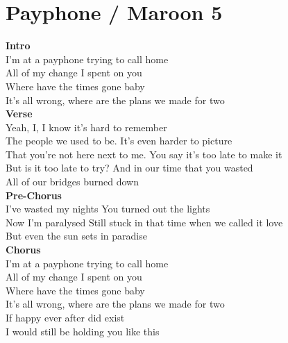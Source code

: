 \section{Payphone / Maroon 5}\label{sec:payphone}

\CaddNine
\DsusFour
\EminorSeven
\Gmajor

\textbf{Intro} \\                      
I'm at a payphone trying to call home          \\          
All of my change I spent on you\\
Where have the times gone baby\\
It's all wrong, where are the plans we made for two\\
\textbf{Verse}\\
Yeah, I, I know it's hard to remember\\
The people we used to be. It's even harder to picture\\
That you're not here next to me. You say it's too late to make it\\
But is it too late to try? And in our time that you wasted\\
All of our bridges burned down\\
\textbf{Pre-Chorus}\\
I've wasted my nights You turned out the lights\\
Now I'm paralysed Still stuck in that time when we called it love\\
But even the sun sets in paradise\\
\textbf{Chorus}\\
I'm at a payphone trying to call home     \\               
All of my change I spent on you\\
Where have the times gone baby\\
It's all wrong, where are the plans we made for two\\
If happy ever after did exist\\
I would still be holding you like this\\
